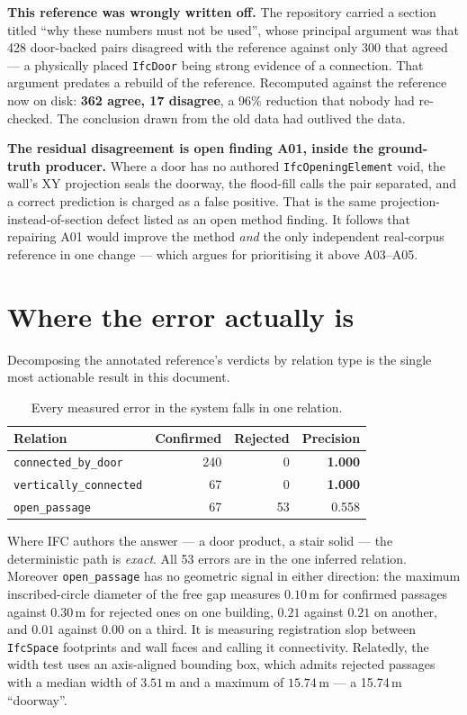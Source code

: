 \documentclass[11pt,a4paper]{article}
\newcommand{\code}[1]{\texttt{\small #1}}
\begin{document}
\noindent
\textbf{This reference was wrongly written off.} The repository carried a
section titled ``why these numbers must not be used'', whose principal argument
was that 428 door-backed pairs disagreed with the reference against only 300
that agreed --- a physically placed \code{IfcDoor} being strong evidence of a
connection. That argument predates a rebuild of the reference. Recomputed
against the reference now on disk: \textbf{362 agree, 17 disagree}, a 96\%
reduction that nobody had re-checked. The conclusion drawn from the old data
had outlived the data.

\noindent
\textbf{The residual disagreement is open finding A01, inside the ground-truth
producer.} Where a door has no authored \code{IfcOpeningElement} void, the
wall's XY projection seals the doorway, the flood-fill calls the pair
separated, and a correct prediction is charged as a false positive. That is the
same projection-instead-of-section defect listed as an open method finding. It
follows that repairing A01 would improve the method \emph{and} the only
independent real-corpus reference in one change --- which argues for
prioritising it above A03--A05.

\section{Where the error actually is}

Decomposing the annotated reference's verdicts by relation type is the single
most actionable result in this document.

\begin{table}[ht]
\centering
\small
\begin{tabular}{lrrr}
\toprule
Relation & Confirmed & Rejected & Precision \\
\midrule
\code{connected\_by\_door} & 240 & 0 & \textbf{1.000} \\
\code{vertically\_connected} & 67 & 0 & \textbf{1.000} \\
\code{open\_passage} & 67 & 53 & 0.558 \\
\bottomrule
\end{tabular}
\caption{Every measured error in the system falls in one relation.}
\end{table}

\noindent
Where IFC authors the answer --- a door product, a stair solid --- the
deterministic path is \emph{exact}. All 53 errors are in the one inferred
relation. Moreover \code{open\_passage} has no geometric signal in either
direction: the maximum inscribed-circle diameter of the free gap measures
$0.10$\,m for confirmed passages against $0.30$\,m for rejected ones on one
building, $0.21$ against $0.21$ on another, and $0.01$ against $0.00$ on a
third. It is measuring registration slop between \code{IfcSpace} footprints and
wall faces and calling it connectivity. Relatedly, the width test uses an
axis-aligned bounding box, which admits rejected passages with a median width of
$3.51$\,m and a maximum of $15.74$\,m --- a 15.74\,m ``doorway''.
\end{document}

